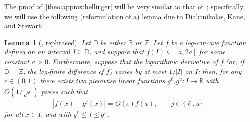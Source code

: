\documentclass[11pt]{article}
\newtheorem{lemma}[theorem]{Lemma}
\theoremstyle{definition}
\newcommand{\R}{\mathbb{R}}
\newcommand{\Z}{\mathbb{Z}}
\newcommand{\eps}{\epsilon}
\newcommand{\abs}[1]{\lvert#1\rvert}
\renewcommand{\abs}[1]{\left\lvert #1 \right\rvert}
\newcommand{\bigO}[1]{{O\left( #1 \right)}}
\begin{document}
The proof of~\cref{theo:approx:hellinger} will be very similar to that of~\cite[Theorem 12]{DKS:16:LLCV}; specifically, we will use the following (reformulation of a) lemma due to Diakonikolas, Kane, and Stewart:
\begin{lemma}[{\cite[Lemma 14]{DKS:16:LLCV}, rephrased}]\label{lemma:logconcave:pointwise:approx}
  Let $\mathbb{D}$ be either $\R$ or $\Z$. Let $f$ be a log-concave function defined on an interval $I\subseteq \mathbb{D}$, and suppose that $f(I)\subseteq [a,2a]$ for some constant $a>0$. Furthermore, suppose that the logarithmic derivative of $f$ (or, if $\mathbb{D}=\Z$, the log-finite difference of $f$) varies by at most $1/\abs{I}$ on $I$; then, for any $\eps\in(0,1)$ there exists two piecewise linear functions $g^\ell,g^u\colon I\mapsto \R$ with $\bigO{1/\sqrt{\eps}}$ pieces such that
  \begin{equation}\label{eq:logconcave:pointwise:approx}
      \abs{f(x)-g^j(x)} = \bigO{\eps}f(x), \qquad j\in\{\ell,u\}
  \end{equation}
  for all $x\in I$, and with $g^\ell\leq f\leq g^u$.
\end{lemma}
\end{document}
